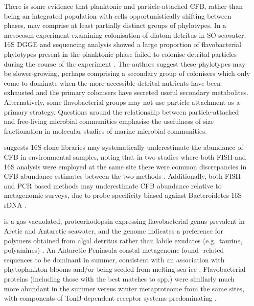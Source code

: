 There is some evidence that planktonic and particle-attached \ac{CFB}, rather than being an integrated population with cells opportunistically shifting between phases, may comprise at least partially distinct groups of phylotypes.
In a mesocosm experiment examining colonisation of diatom detritus in \ac{SO} seawater, 16S \ac{DGGE} and sequencing analysis showed a large proportion of flavobacterial phylotypes present in the planktonic phase failed to colonise detrital particles during the course of the experiment \cite{Abell:dh}.
The authors suggest these phylotypes may be slower-growing, perhaps comprising a secondary group of colonisers which only come to dominate when the more accessible detrital nutrients have been exhausted and the primary colonisers have secreted useful secondary metabolites.
Alternatively, some flavobacterial groups may not use particle attachment as a primary strategy.
Questions around the relationship between particle-attached and free-living microbial communities emphasise the usefulness of size fractionation in molecular studies of marine microbial communities.

\citet{Kirchman:2002ub} suggests 16S clone libraries may systematically underestimate the abundance of \ac{CFB} in environmental samples, noting that in two studies where both \ac{FISH} and 16S analysis were employed at the same site there were common discrepancies in \ac{CFB} abundance estimates between the two methods \cite{Cottrell:2000iq,Eilers:2000in}.
Additionally, both \ac{FISH} and PCR based methods may underestimate \ac{CFB} abundance relative to metagenomic surveys, due to probe specificity biased against Bacteroidetes 16S rDNA \cite{Cottrell:2005bo,OSullivan:2006km}.

 is a gas-vacuolated, proteorhodopsin-expressing flavobacterial genus prevalent in Arctic and Antarctic seawater, and the genome indicates a preference for polymers obtained from algal detritus rather than labile exudates (e.g.\ taurine, polyamines) \cite{Gonzalez:2008tn}.
An Antarctic Peninsula coastal metagenome found -related sequences to be dominant in summer, consistent with an association with phytoplankton blooms and/or being seeded from melting sea-ice \cite{Grzymski:2012ej}.
Flavobacterial proteins (including those with the best matches to  spp.) were similarly much more abundant in the summer versus winter metaproteome from the same sites, with components of TonB-dependent receptor systems predominating \cite{Williams:2012bs}. 

